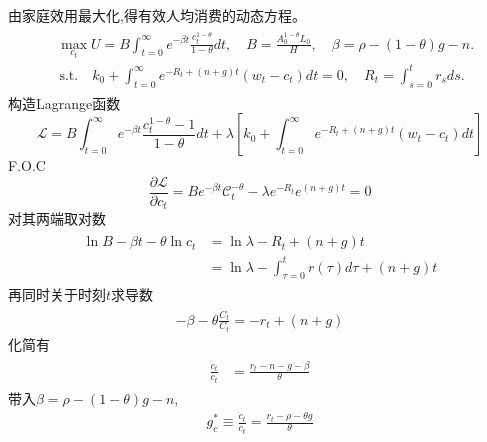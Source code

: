 \documentclass[cn,normal,11pt,black]{elegantnote}
\begin{document}
由家庭效用最大化,得有效人均消费的动态方程。
        \begin{align}
          \begin{aligned}
            & \max_{c_t} U = B\int_{t=0}^\infty e^{-\beta t} \frac{c_t^{1-\theta} }{1-\theta} dt, 
            \quad B=\frac{A_0^{1-\theta} L_0}{H},
            \quad \beta = \rho - (1-\theta)g - n. \\ 
            & \, \mathrm{s.t.} \quad k_0 + \int_{t=0}^\infty e^{-R_t + (n+g)t} (w_t - c_t) dt = 0,
            \quad R_t = \int_{s=0}^t r_s ds.
          \end{aligned}
        \end{align}
        构造Lagrange函数
        \begin{equation}
            \mathcal{L} = B\int_{t=0}^\infty e^{-\beta t} \frac{c_t^{1-\theta} -1}{1-\theta} dt +
                \lambda \left[k_0 + \int_{t=0}^\infty e^{-R_t + (n+g)t} (w_t - c_t) dt\right]
        \end{equation}
        F.O.C
        \begin{equation}
              \frac{\partial \mathcal{L}}{\partial c_t} = 
                     B e^{-\beta t} \mathcal{C}_t^{-\theta} - \lambda e^{-R_t} e^{(n+g) t} = 0
        \end{equation}
        对其两端取对数
        \begin{align}
            \begin{aligned} 
                \ln B-\beta t-\theta \ln c_t &= \ln \lambda-R_t+(n+g) t \\ 
                    &= \ln \lambda-\int_{\tau=0}^{t} r(\tau) d \tau+(n+g) t 
            \end{aligned}
        \end{align}
        再同时关于时刻$t$求导数
        \begin{align}
            -\beta-\theta \frac{\dot{C}_t}{C_t}=-r_t+(n+g)
        \end{align}
        化简有
        \begin{align} 
            \begin{aligned} 
                \frac{\dot{c}_t}{c_t} &=\frac{r_t-n-g-\beta}{\theta}                          
            \end{aligned}
        \end{align}
        带入$\beta = \rho - (1-\theta)g - n$,
        \begin{align} \label{ramseygc}
            g_c^* \equiv \frac{\dot{c}_t}{c_t}= \frac{r_t-\rho-\theta g}{\theta}
        \end{align}
        
\end{document}
